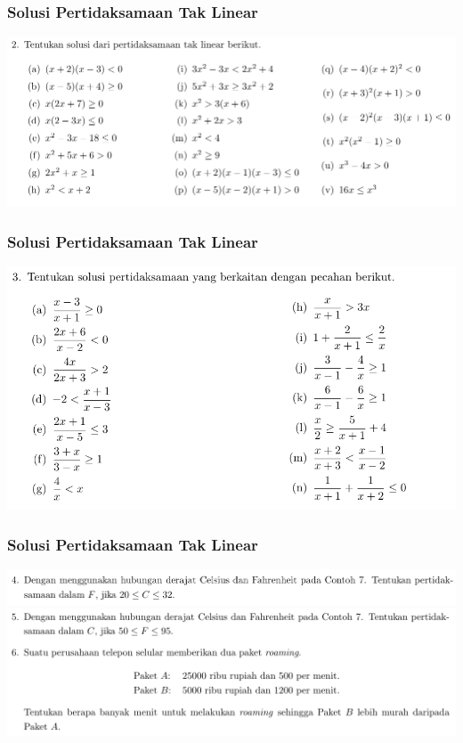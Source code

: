 \documentclass[pdflatex,compress,mathserif]{beamer}
\begin{document}
\begin{frame}
	\frametitle{Solusi Pertidaksamaan Tak Linear}
	\begin{center}
		\includegraphics[width=\linewidth]{img/img19}
	\end{center}
\end{frame}

\begin{frame}
	\frametitle{Solusi Pertidaksamaan Tak Linear}
	\begin{center}
		\includegraphics[width=\linewidth]{img/img20}
	\end{center}
\end{frame}

\begin{frame}
	\frametitle{Solusi Pertidaksamaan Tak Linear}
	\begin{center}
		\includegraphics[width=\linewidth]{img/img21}
		\includegraphics[width=\linewidth]{img/img22}
	\end{center}
\end{frame}
\end{document}
